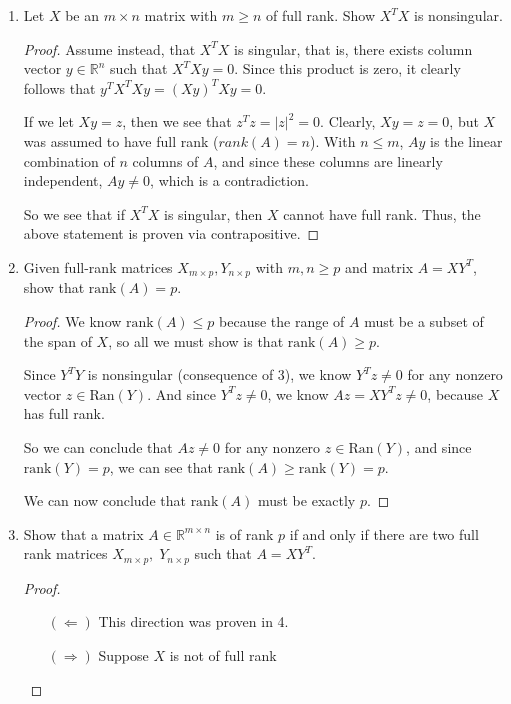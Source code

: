 \documentclass[11pt]{article}
\newcommand{\R}{\mathbb{R}}
\begin{document}
\begin{enumerate}
	\item Let \(X\) be an \(m \times n\) matrix with \(m \geq n\) of full rank.  Show \(X^T X\) is nonsingular.
	      \begin{proof}
		      Assume instead, that \(X^TX\) is singular, that is, there exists column vector \(y \in \R^n\) such that \(X^TXy = 0\).  Since this product is zero, it clearly follows that \(y^TX^TXy = (Xy)^T Xy = 0\).

		      If we let \(Xy = z\), then we see that \(z^T z = |z|^2 = 0\).  Clearly, \(Xy = z = 0\), but \(X\) was assumed to have full rank (\(rank(A) = n\)).  With \(n \leq m\), \(Ay\) is the linear combination of \(n\) columns of \(A\), and since these columns are linearly independent, \(Ay \neq 0\), which is a contradiction.

		      So we see that if \(X^TX\) is singular, then \(X\) cannot have full rank.  Thus, the above statement is proven via contrapositive.
	      \end{proof}

	\item Given full-rank matrices \(X_{m \times p}, Y_{n \times p}\) with \(m,n \geq p\) and matrix \(A = XY^T\), show that \(\text{rank}(A) = p\).
	      \begin{proof}
		      We know \(\text{rank}(A) \leq p\) because the range of \(A\) must be a subset of the span of \(X\), so all we must show is that \(\text{rank}(A) \geq p\).

		      Since \(Y^TY\) is nonsingular (consequence of 3), we know \(Y^Tz \neq 0\) for any nonzero vector \(z \in \text{Ran}(Y)\).  And since \(Y^Tz \neq 0\), we know \(Az = XY^Tz \neq 0\), because \(X\) has full rank.

		      So we can conclude that \(Az \neq 0\) for any nonzero \(z \in \text{Ran}(Y)\), and since \(\text{rank}(Y) = p\), we can see that \(\text{rank}(A) \geq \text{rank}(Y) = p\).

		      We can now conclude that \(\text{rank}(A)\) must be exactly \(p\).
	      \end{proof}

	\item Show that a matrix \(A \in \R^{m \times n}\) is of rank \(p\) if and only if there are two full rank matrices \(X_{m \times p}, \; Y_{n \times p}\) such that \(A = XY^T\).
	      \begin{proof}
		      \begin{itemize}
			      \item[\((\Leftarrow)\)] This direction was proven in 4.
			      \item[\((\Rightarrow)\)] Suppose \(X\) is not of full rank
		      \end{itemize}
	      \end{proof}


\end{enumerate}
\end{document}
